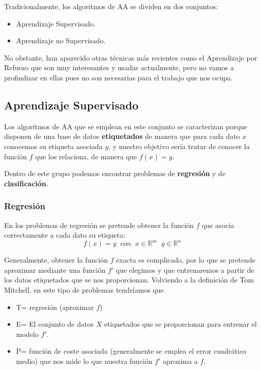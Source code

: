     \medskip

    \noindent Tradicionalmente, los algoritmos de AA se dividen en dos conjuntos:

    \begin{itemize}
        \item Aprendizaje Supervisado.
        \item Aprendizaje no Supervisado.
    \end{itemize}

    \medskip 
    
    \noindent No obstante, han aparecido otras técnicas más recientes como el Aprendizaje por Refuezo que son muy interesantes y usadas actualmente, pero no vamos a profindizar en ellas pues no son necesarias para el trabajo que nos ocupa.

    \subsection{Aprendizaje Supervisado}
        \noindent Los algoritmos de AA que se emplean en este conjunto se caracterizan porque disponen de una base de datos \textbf{etiquetados} de manera que para cada dato $x$ conocemos su etiqueta asociada $y$, y nuestro objetivo sería tratar de conocer la función $f$ que los relaciona, de manera que $f(x)=y$.

        \medskip

        \noindent Dentro de este grupo podemos encontrar problemas de \textbf{regresión} y de \textbf{clasificación}.

        \subsubsection{Regresión}
            \noindent En los problemas de regresión se pretende obtener la función $f$ que asocia correctamente a cada dato su etiqueta: 
            \begin{equation}
                f(x)=y \; \; con \; \; x\in \mathbb{R}^m \; \; y \in \mathbb{R}^n
            \end{equation}
            
            \noindent Generalmente, obtener la función $f$ exacta es complicado, por lo que se pretende aproximar mediante una función $f'$ que elegimos y que entrenaremos a partir de los datos etiquetados que se nos proporcionan. Volviendo a la definición de Tom Mitchell, en este tipo de problemas tendríamos que 
            
            \begin{itemize}
                \item T= regresión (aproximar $f$)
                \item E= El conjunto de datos $X$ etiquetados que se proporcionan para entrenar el modelo $f'$.
                \item P= función de coste asociada (generalmente se emplea el error cuadrático medio) que nos mide lo  que nuestra función $f'$ aproxima a $f$.
            \end{itemize}
            
